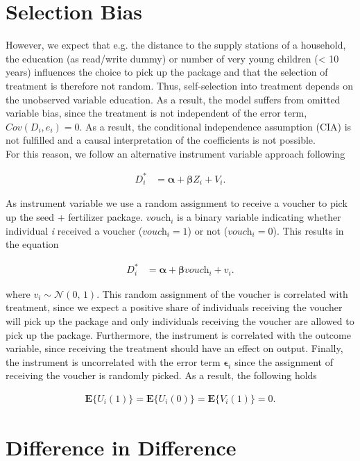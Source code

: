 \section{Selection Bias} \label{sec:selection}

However, we expect that e.g. the distance to the supply stations of a household, the education (as read/write dummy) or number of very young children (< 10 years) influences the choice to pick up the package and that the selection of treatment is therefore not random. Thus, self-selection into treatment depends on the unobserved variable education. As a result, the model suffers from omitted variable bias, since the treatment is not independent of the error term, $Cov(\textit{D}_i, \textit{e}_i) = 0$. As a result, the conditional independence assumption (CIA) is not fulfilled and a causal interpretation of the coefficients is not possible.\\ 

For this reason, we follow an alternative instrument variable approach following 

\begin{align}
	\label{eq:eq8}
	\textit{D}_i^\ast &= \boldsymbol{\alpha} + \boldsymbol{\beta} \textit{Z}_i + \textit{V}_i.
\end{align}

As instrument variable we use a random assignment to receive a voucher to pick up the seed + fertilizer package. $\textit{vouch}_i$ is a binary variable indicating whether individual \textit{i} received a voucher ($\textit{vouch}_i = 1$) or not ($\textit{vouch}_i = 0$). This results in the equation

\begin{align}
	\label{eq:eq9}
	\textit{D}_i^\ast &= \boldsymbol{\alpha} + \boldsymbol{\beta} \textit{vouch}_i + \textit{v}_i.
\end{align}

where $\textit{v}_i \sim \mathcal{N}(0,\,1)$. This random assignment of the voucher is correlated with treatment, since we expect a positive share of individuals receiving the voucher will pick up the package and only individuals receiving the voucher are allowed to pick up the package. Furthermore, the instrument is correlated with the outcome variable, since receiving the treatment should have an effect on output. Finally, the instrument is uncorrelated with the error term $\boldsymbol{\epsilon}_i$ since the assignment of receiving the voucher is randomly picked. As a result, the following holds

\begin{align}
	\label{eq:eq10}
	\boldsymbol{E}\{\textit{U}_i(1)\} = \boldsymbol{E}\{\textit{U}_i(0)\} = \boldsymbol{E}\{\textit{V}_i(1)\} = 0.
\end{align}



\section{Difference in Difference} \label{sec:difference}


\clearpage





\clearpage



